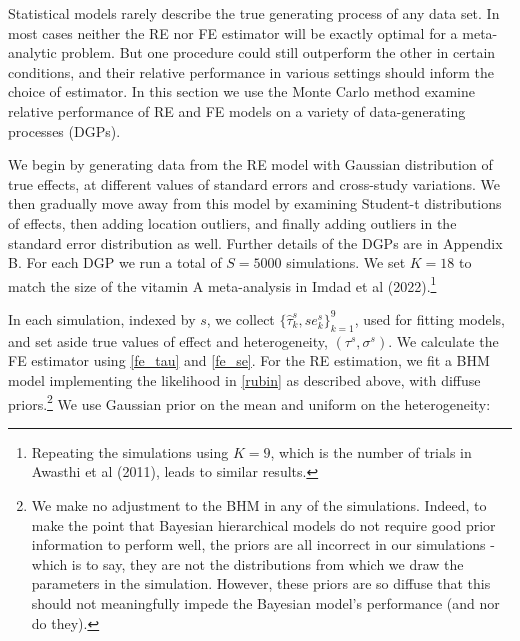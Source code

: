 \documentclass[12pt]{article}
\begin{document}
Statistical models rarely describe the true generating process of any data set. In most cases neither the RE nor FE estimator will be exactly optimal for a meta-analytic problem. But one procedure could still outperform the other in certain conditions, and their relative performance in various settings should inform the choice of estimator. In this section we use the Monte Carlo method examine relative performance of RE and FE models on a variety of data-generating processes (DGPs).

We begin by generating data from the RE model with Gaussian distribution of true effects, at different values of standard errors and cross-study variations. We then gradually move away from this model by examining Student-t distributions of effects, then adding location outliers, and finally adding outliers in the standard error distribution as well. Further details of the DGPs are in Appendix B. For each DGP we run a total of $S = 5000$ simulations. We set $K=18$ to match the size of the vitamin A meta-analysis in Imdad et al (2022).\footnote{Repeating the simulations using $K=9$, which is the number of trials in Awasthi et al (2011), leads to similar results.}

In each simulation, indexed by $s$, we collect $\{\hat{\tau}_k^s, se_k^s\}_{k=1}^9$, used for fitting models, and set aside true values of effect and heterogeneity, $(\tau^{s}, \sigma^{s})$. We calculate the FE estimator using \eqref{fe_tau} and \eqref{fe_se}. For the RE estimation, we fit a BHM model implementing the likelihood in \eqref{rubin} as described above, with diffuse priors.\footnote{We make no adjustment to the BHM in any of the simulations. Indeed, to make the point that Bayesian hierarchical models do not require good prior information to perform well, the priors are all incorrect in our simulations - which is to say, they are not the distributions from which we draw the parameters in the simulation. However, these priors are so diffuse that this should not meaningfully impede the Bayesian model's performance (and nor do they).} We use Gaussian prior on the mean and uniform on the heterogeneity:

% 
% 
\end{document}
